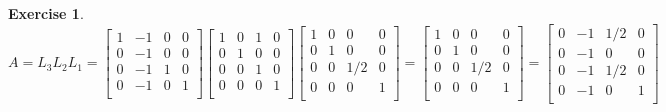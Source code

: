 \documentclass[paper=a4, fontsize=11pt]{scrartcl} %
\numberwithin{equation}{section} %
\numberwithin{figure}{section} %
\numberwithin{table}{section} %
\newtheorem{exercise}{Exercise}
\numberwithin{exercise}{section}
\begin{document}
\begin{exercise}
$$A=L_3L_2L_1= \begin{bmatrix}
1& -1& 0 & 0 \\
0 & -1&  0& 0 \\
0 & -1 & 1 & 0 \\
0 & -1 & 0 & 1\\
\end{bmatrix}\begin{bmatrix}
1& 0 &1  & 0 \\
0 & 1 & 0& 0 \\
0 & 0 & 1 & 0 \\
0 & 0 &  0& 1\\
\end{bmatrix}\begin{bmatrix}
1& 0 & 0 & 0 \\
0 & 1 &  0& 0 \\
0 & 0 & 1/2 & 0 \\
0 & 0 & 0 & 1\\
\end{bmatrix}=\begin{bmatrix}
1& 0 & 0 & 0 \\
0 & 1 &  0& 0 \\
0 & 0 & 1/2 & 0 \\
0 & 0 & 0 & 1\\
\end{bmatrix}
=\begin{bmatrix}
 0 &-1& 1/2& 0\\
 0 &-1& 0& 0\\
  0 &-1 &1/2& 0\\
  0& -1 & 0& 1\\\end{bmatrix}$$
 

\end{exercise}
\end{document}
